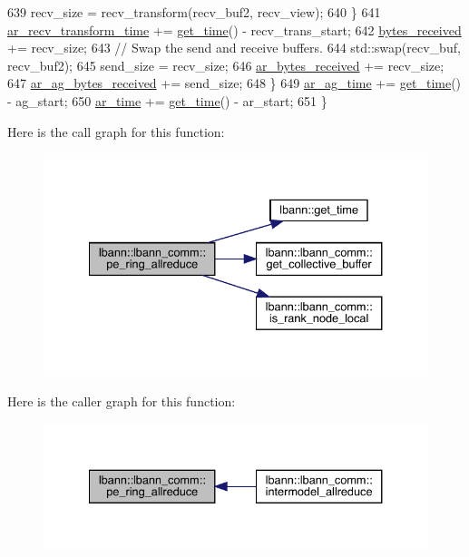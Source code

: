 \begin{DoxyCode}
639       recv\_size = recv\_transform(recv\_buf2, recv\_view);
640     \}
641     \hyperlink{classlbann_1_1lbann__comm_adb393f47d60eaa59bace80d2d3dd3bf2}{ar\_recv\_transform\_time} += \hyperlink{namespacelbann_a478d36031ff0659893c4322cd856157f}{get\_time}() - recv\_trans\_start;
642     \hyperlink{classlbann_1_1lbann__comm_afb99f57f7eafc0695bf28e6c26a8120f}{bytes\_received} += recv\_size;
643     \textcolor{comment}{// Swap the send and receive buffers.}
644     std::swap(recv\_buf, recv\_buf2);
645     send\_size = recv\_size;
646     \hyperlink{classlbann_1_1lbann__comm_aa5f3c53358bf9002b9fab41918b0c8c1}{ar\_bytes\_received} += recv\_size;
647     \hyperlink{classlbann_1_1lbann__comm_afded6f478dc5021d1edec306dc6c528c}{ar\_ag\_bytes\_received} += send\_size;
648   \}
649   \hyperlink{classlbann_1_1lbann__comm_a48768342eb05c1c6cdaa52c3599b93c8}{ar\_ag\_time} += \hyperlink{namespacelbann_a478d36031ff0659893c4322cd856157f}{get\_time}() - ag\_start;
650   \hyperlink{classlbann_1_1lbann__comm_aa57d2fbeef85fd8a3c9f2a37ca7687c8}{ar\_time} += \hyperlink{namespacelbann_a478d36031ff0659893c4322cd856157f}{get\_time}() - ar\_start;
651 \}
\end{DoxyCode}
Here is the call graph for this function\+:\nopagebreak
\begin{figure}[H]
\begin{center}
\leavevmode
\includegraphics[width=334pt]{classlbann_1_1lbann__comm_ac294fe5fa47f283aba31fa1abfa99438_cgraph}
\end{center}
\end{figure}
Here is the caller graph for this function\+:\nopagebreak
\begin{figure}[H]
\begin{center}
\leavevmode
\includegraphics[width=334pt]{classlbann_1_1lbann__comm_ac294fe5fa47f283aba31fa1abfa99438_icgraph}
\end{center}
\end{figure}

